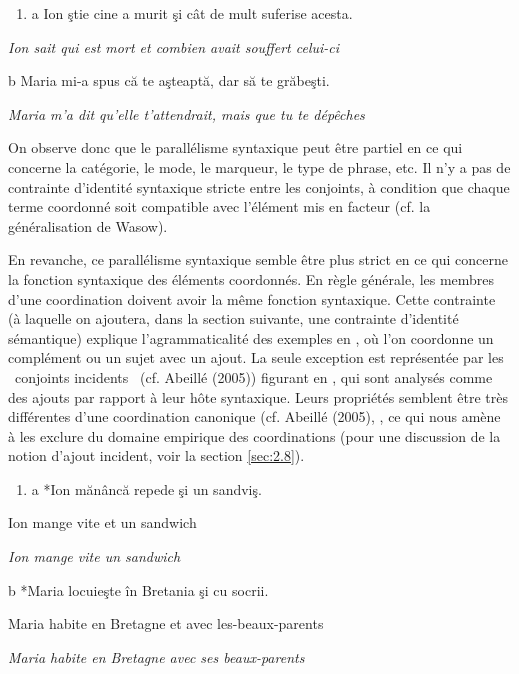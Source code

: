 \begin{enumerate}
\item \label{bkm:Ref300774271}a  Ion ştie cine a murit şi cât de mult suferise acesta.  


\end{enumerate}
{\itshape
Ion sait qui est mort et combien avait souffert celui-ci}

  b  Maria mi-a spus că te aşteaptă, dar să te grăbeşti.    

{\itshape
Maria m'a dit qu'elle t'attendrait, mais que tu te dépêches} 

On observe donc que le parallélisme syntaxique peut être partiel en ce qui concerne la catégorie, le mode, le marqueur, le type de phrase, etc. Il n'y a pas de contrainte d'identité syntaxique stricte entre les conjoints, à condition que chaque terme coordonné soit compatible avec l'élément mis en facteur (cf. la généralisation de Wasow). 

En revanche, ce parallélisme syntaxique semble être plus strict en ce qui concerne la fonction syntaxique des éléments coordonnés. En règle générale, les membres d'une coordination doivent avoir la même fonction syntaxique. Cette contrainte (à laquelle on ajoutera, dans la section suivante, une contrainte d'identité sémantique) explique l'agrammaticalité des exemples en , où l'on coordonne un complément ou un sujet avec un ajout. La seule exception est représentée par les {\guillemotleft}~conjoints incidents~{\guillemotright} (cf. Abeillé (2005)) figurant en , qui sont analysés comme des ajouts par rapport à leur hôte syntaxique. Leurs propriétés semblent être très différentes d'une coordination canonique (cf. Abeillé (2005), \citet{Mouret2007}, ce qui nous amène à les exclure du domaine empirique des coordinations (pour une discussion de la notion d'ajout incident, voir la section \ref{sec:2.8}).


\begin{enumerate}
\item \label{bkm:Ref300776667}a  *Ion  mănâncă  repede  şi  un  sandviş.


\end{enumerate}
Ion  mange  vite  et  un  sandwich

{\itshape
Ion mange vite un sandwich}

b  *Maria  locuieşte  în  Bretania  şi  cu  socrii. 

  Maria  habite  en  Bretagne  et  avec  les-beaux-parents

{\itshape
Maria habite en Bretagne avec ses beaux-parents}

